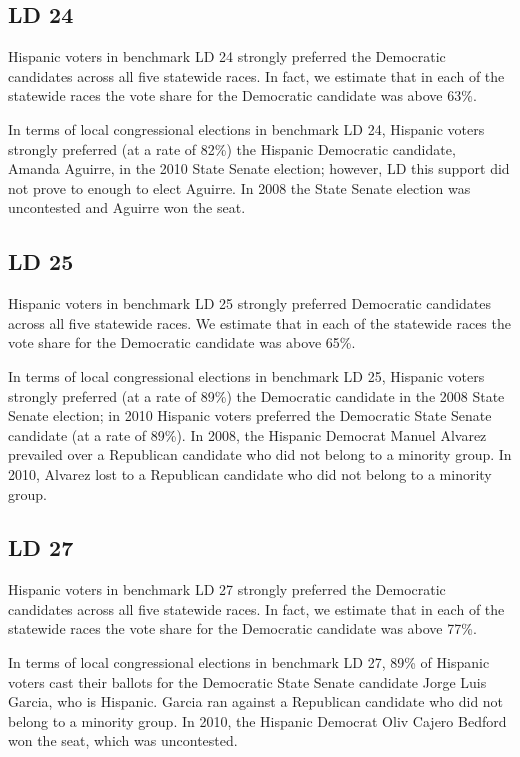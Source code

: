 \documentclass[12pt]{article}
\begin{document}
\subsection{LD 24}

Hispanic voters in benchmark LD 24 strongly preferred the Democratic
candidates across all five statewide races. In fact, we estimate that
in each of the statewide races the vote share for the Democratic
candidate was above 63\%.

In terms of local congressional elections in benchmark LD 24, Hispanic
voters strongly preferred (at a rate of 82\%) the Hispanic Democratic
candidate, Amanda Aguirre, in the 2010 State Senate election; however,
LD this support did not prove to enough to elect Aguirre. In 2008 the
State Senate election was uncontested and Aguirre won the seat.

\subsection{LD 25}

Hispanic voters in benchmark LD 25 strongly preferred Democratic
candidates across all five statewide races.  We estimate that in each
of the statewide races the vote share for the Democratic candidate was
above 65\%.

In terms of local congressional elections in benchmark LD 25, Hispanic
voters strongly preferred (at a rate of 89\%) the Democratic candidate
in the 2008 State Senate election; in 2010 Hispanic voters preferred
the Democratic State Senate candidate (at a rate of 89\%). In 2008, the Hispanic Democrat Manuel Alvarez prevailed over a Republican candidate who did not belong to a minority group. In 2010, Alvarez lost to a Republican candidate who did not belong to a minority group.

\subsection{LD 27}

Hispanic voters in benchmark LD 27 strongly preferred the Democratic
candidates across all five statewide races. In fact, we estimate that
in each of the statewide races the vote share for the Democratic
candidate was above 77\%.

In terms of local congressional elections in benchmark LD 27, 89\% of
Hispanic voters cast their ballots for the Democratic State Senate
candidate Jorge Luis Garcia, who is Hispanic. Garcia ran against a
Republican candidate who did not belong to a minority group. In 2010,
the Hispanic Democrat Oliv Cajero Bedford won the seat, which was
uncontested.
\end{document}
